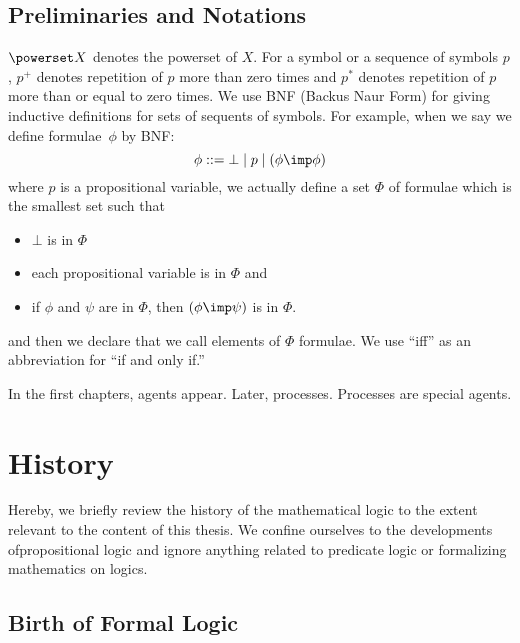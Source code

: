 \subsection{Preliminaries and Notations}

  $\powerset X$ denotes the powerset of $X$.
  For a symbol or a sequence of symbols $p$,
  $p^+$ denotes repetition of $p$ more than zero times and
  $p^*$ denotes repetition of $p$ more than or equal to zero times.
  We use BNF (Backus Naur Form) for giving inductive definitions for sets
  of sequents of symbols.
  For example, when we say we define formulae~$\phi$ by BNF:
  \[
   \phi::= \bot \mid p\mid (\phi\imp\phi)
  \]
  where $p$ is a propositional variable, we actually define a set $\Phi$
  of formulae which is the smallest set such that
  \begin{itemize}
   \item $\bot$ is in $\Phi$
   \item each propositional variable is in $\Phi$ and
   \item if $\phi$ and $\psi$ are in $\Phi$, then $(\phi\imp\psi)$ is in $\Phi$.
  \end{itemize}
  and then we declare that we call elements of $\Phi$ formulae.
  We use ``iff'' as an abbreviation for ``if and only if.''

  In the first chapters, agents appear.  Later, processes.  Processes
  are special agents.





\section{History}

Hereby, we briefly review the history of the mathematical logic to the
extent relevant to the content of this thesis.
We confine ourselves to the developments ofpropositional logic and
ignore anything related to predicate logic or formalizing mathematics on
logics.

\subsection{Birth of Formal Logic}

